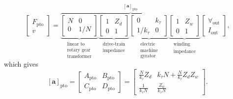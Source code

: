 \documentclass[5p,times]{elsarticle}
\begin{document}
\begin{equation}
 	\label{eq:Z_cascade_to_ABCD}
 	\begin{bmatrix} 
 		F_{\textrm{pto}} \\
 		v 
 	\end{bmatrix} 
 	\! = \!
        \overbrace{
 	\underbrace{
        \begin{bmatrix} 
                N & 0 \\ 
                0 & 1/N 
        \end{bmatrix}
        }_{\substack{\text{linear to} \\ \text{rotary gear} \\ \text{transformer}}}
        \underbrace{
  	\begin{bmatrix} 
	 	1 & Z_d \\ 
 		0 & 1 
	\end{bmatrix}
        }_{\substack{\text{drive-train} \\ \text{impedance}}}
        \underbrace{
   	\begin{bmatrix} 
	 	0 & k_{\tau} \\ 
	 	1/k_{\tau} & 0 
        \end{bmatrix}
        }_{\substack{\text{electric} \\ \text{machine} \\ \text{gyrator}}}
        \underbrace{
   	\begin{bmatrix} 
	 	1 & Z_w \\ 
	 	0 & 1 
	\end{bmatrix}
        }_{\substack{\text{winding} \\ \text{impedance}}}
        }^{\left[ \mathbf{a} \right]_{\textrm{pto}}}
 	\begin{bmatrix} 
 		\forall_{\textrm{out}} \\
 		I_{\textrm{out}} 
 	\end{bmatrix} \!, 
\end{equation}
%
which gives
%
\begin{equation}
        \left[ \mathbf{a} \right]_{\textrm{pto}}
	= 
	\begin{bmatrix} 
		A_{\textrm{pto}} & B_{\textrm{pto}} \\ 
		C_{\textrm{pto}} & D_{\textrm{pto}} 
	\end{bmatrix}
	=
	\begin{bmatrix} 
		\frac{N}{k_{\tau}}  Z_d & k_\tau N +\frac{N}{k_{\tau}}  Z_dZ_w  \\
		\frac{1}{k_{\tau}N}     & \frac{Z_w}{k_{\tau}N} 
	\end{bmatrix}.
	\label{eq:pto_abcd}
\end{equation}
\end{document}
